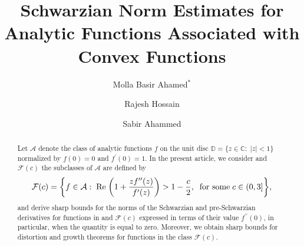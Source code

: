 \documentclass[a4paper,12pt]{amsart}
\theoremstyle{plain}
\theoremstyle{definition}
\theoremstyle{plain}
\newcounter{minutes}\setcounter{minutes}{\time}
\newcounter{hours}\setcounter{hours}{\time}
\begin{document}
\title{Schwarzian Norm Estimates for Analytic Functions Associated with Convex Functions}

\author{Molla Basir Ahamed$^*$}
\address{Molla Basir Ahamed, Department of Mathematics, Jadavpur University, Kolkata-700032, West Bengal, India.}

\author{Rajesh Hossain}
\address{Rajesh Hossain, Department of Mathematics, Jadavpur University, Kolkata-700032, West Bengal, India.}

\author{Sabir Ahammed}
\address{Sabir Ahammed, Department of Mathematics, Jadavpur University, Kolkata-700032, West Bengal, India.}


\def\thefootnote{}
 \makeatletter\def\thefootnote{\@arabic\c@footnote}\makeatother
\begin{abstract} 
		Let $\mathcal{A}$ denote the class of analytic functions $f$ on the unit disc $\mathbb{D}=\{z\in\mathbb{C}:\;|z|<1\}$ normalized by $f(0)=0$ and $f^{\prime}(0)=1$. In the present article, we consider and $\mathcal{F}(c)$ the subclasses of $\mathcal{A}$ are defined by
	\begin{align*}
		\mathcal{F}(c)=\bigg\{f\in\mathcal{A}:\;{\rm Re}\;\bigg(1+\frac{zf^{\prime\prime}(z)}{f^{\prime}(z)}\bigg)>1-\frac{c}{2},\;\;\mbox{for some}\;c\in(0,3]\bigg\},
	\end{align*}
	and derive sharp bounds for the norms of the Schwarzian and pre-Schwarzian derivatives for functions in and $\mathcal{F}(c)$ expressed in terms of their value $f^{\prime\prime}(0)$, in particular, when the quantity is equal to zero. Moreover, we obtain sharp bounds for distortion and growth theorems for functions in the class $\mathcal{F}(c)$.
\end{abstract}
\maketitle
\pagestyle{myheadings}
\end{document}
